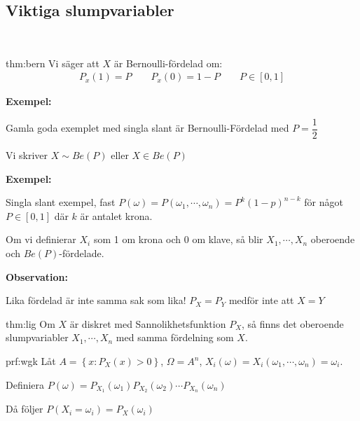 \subsection{Viktiga slumpvariabler}\hfill\\\par
\begin{theo}{thm:bern}
  Vi säger att $X$ är Bernoulli-fördelad om:
  \begin{equation*}
    \begin{gathered}
      P_x(1) = P\qquad P_x(0) = 1-P\qquad P\in[0,1]
    \end{gathered}
  \end{equation*}
\end{theo}
\par\bigskip
\noindent\textbf{Exempel:}\par
\noindent Gamla goda exemplet med singla slant är Bernoulli-Fördelad med $P=\dfrac{1}{2}$ 
\par\bigskip
\noindent Vi skriver $X\sim Be(P)$ eller $X\in Be(P)$
\par\bigskip
\noindent\textbf{Exempel:}\par
\noindent Singla slant exempel, fast $P(\omega) = P(\omega_1, \cdots, \omega_n) = P^k(1-p)^{n-k}$ för något $P\in[0,1]$ där $k$ är antalet krona.\par
\noindent Om vi definierar $X_i$ som 1 om krona och 0 om klave, så blir $X_1,\cdots, X_n$ oberoende och $Be(P)$-fördelade.
\par\bigskip
\noindent\textbf{Observation:}\par
\noindent Lika fördelad är inte samma sak som lika! $P_X=P_Y$ medför inte att $X=Y$
\par\bigskip
\begin{theo}[Existens]{thm:lig}
  Om $X$ är diskret med Sannolikhetsfunktion $P_X$, så finns det oberoende slumpvariabler $X_1,\cdots, X_n$ med samma fördelning som $X$.
\end{theo}
\par\bigskip
\begin{prf}{prf:wgk}
  Låt $A=\left\{x:P_X(x)>0\right\}$, $\Omega=A^n$, $X_i(\omega) = X_i(\omega_1,\cdots, \omega_n) = \omega_i$.
  \par\bigskip
  \noindent Definiera $P(\omega) = P_{X_1}(\omega_1)P_{X_2}(\omega_2)\cdots P_{X_n}(\omega_n)$\par
  \noindent Då följer $P(X_i = \omega_i) = P_X(\omega_i)$
\end{prf}
